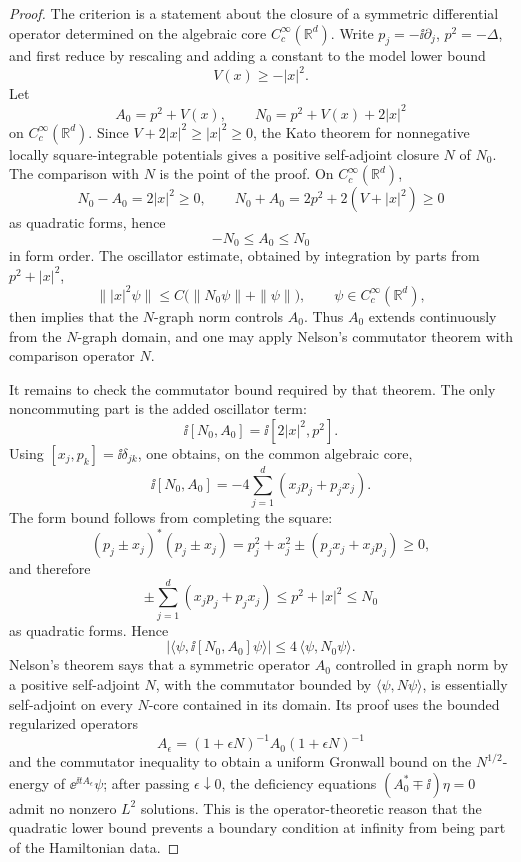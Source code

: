 \begin{proof}
The criterion is a statement about the closure of a symmetric differential
operator determined on the algebraic core \(C_c^\infty(\mathbb R^d)\).
Write \(p_j=-\ii\partial_j\), \(p^2=-\Delta\), and first reduce by rescaling
and adding a constant to the model lower bound
\[
  V(x)\ge -|x|^2 .
\]
Let
\[
  A_0=p^2+V(x),
  \qquad
  N_0=p^2+V(x)+2|x|^2
\]
on \(C_c^\infty(\mathbb R^d)\).  Since \(V+2|x|^2\ge |x|^2\ge0\), the
Kato theorem for nonnegative locally square-integrable potentials gives a
positive self-adjoint closure \(N\) of \(N_0\).  The comparison with \(N\) is
the point of the proof.  On \(C_c^\infty(\mathbb R^d)\),
\[
  N_0-A_0=2|x|^2\ge0,
  \qquad
  N_0+A_0=2p^2+2(V+|x|^2)\ge0
\]
as quadratic forms, hence
\[
  -N_0\le A_0\le N_0
\]
in form order.  The oscillator estimate, obtained by integration by parts
from \(p^2+|x|^2\),
\[
  \||x|^2\psi\|
  \le
  C\bigl(\|N_0\psi\|+\|\psi\|\bigr),
  \qquad
  \psi\in C_c^\infty(\mathbb R^d),
\]
then implies that the \(N\)-graph norm controls \(A_0\).  Thus \(A_0\)
extends continuously from the \(N\)-graph domain, and one may apply Nelson's
commutator theorem with comparison operator \(N\).

It remains to check the commutator bound required by that theorem.  The only
noncommuting part is the added oscillator term:
\[
  \ii[N_0,A_0]
  =
  \ii[2|x|^2,p^2].
\]
Using \([x_j,p_k]=\ii\delta_{jk}\), one obtains, on the common algebraic
core,
\[
  \ii[N_0,A_0]
  =
  -4\sum_{j=1}^d(x_jp_j+p_jx_j).
\]
The form bound follows from completing the square:
\[
  (p_j\pm x_j)^*(p_j\pm x_j)
  =
  p_j^2+x_j^2\pm(p_jx_j+x_jp_j)\ge0,
\]
and therefore
\[
  \pm\sum_{j=1}^d(x_jp_j+p_jx_j)
  \le
  p^2+|x|^2
  \le
  N_0
\]
as quadratic forms.  Hence
\[
  \bigl|\langle\psi,\ii[N_0,A_0]\psi\rangle\bigr|
  \le
  4\,\langle\psi,N_0\psi\rangle .
\]
Nelson's theorem says that a symmetric operator \(A_0\) controlled in graph
norm by a positive self-adjoint \(N\), with the commutator bounded by
\(\langle\psi,N\psi\rangle\), is essentially self-adjoint on every
\(N\)-core contained in its domain.  Its proof uses the bounded regularized
operators
\[
  A_\epsilon=(1+\epsilon N)^{-1}A_0(1+\epsilon N)^{-1}
\]
and the commutator inequality to obtain a uniform Gronwall bound on the
\(N^{1/2}\)-energy of \(\ee^{\ii tA_\epsilon}\psi\); after passing
\(\epsilon\downarrow0\), the deficiency equations
\((A_0^*\mp\ii)\eta=0\) admit no nonzero \(L^2\) solutions.  This is the
operator-theoretic reason that the quadratic lower bound prevents a boundary
condition at infinity from being part of the Hamiltonian data.
\end{proof}

